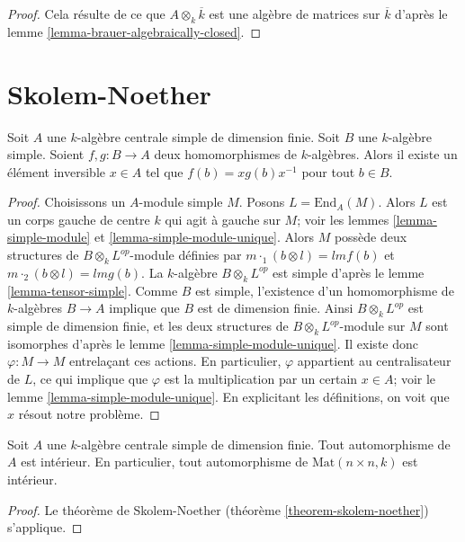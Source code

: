 \begin{proof}
Cela résulte de ce que $A \otimes_k \overline{k}$ est une algèbre de matrices
sur $\overline{k}$ d'après le
lemme \ref{lemma-brauer-algebraically-closed}.
\end{proof}
\section{Skolem-Noether}
\label{section-skolem-noether}



\begin{theorem}
\label{theorem-skolem-noether}
Soit $A$ une $k$-algèbre centrale simple de dimension finie. Soit $B$ une
$k$-algèbre simple. Soient $f, g : B \to A$ deux homomorphismes de $k$-algèbres.
Alors il existe un élément inversible $x \in A$ tel que
$f(b) = xg(b)x^{-1}$ pour tout $b \in B$.
\end{theorem}

\begin{proof}
Choisissons un $A$-module simple $M$. Posons $L = \text{End}_A(M)$.
Alors $L$ est un corps gauche de centre $k$ qui agit à gauche sur $M$; voir les
lemmes \ref{lemma-simple-module} et \ref{lemma-simple-module-unique}.
Alors $M$ possède deux structures de $B \otimes_k L^{op}$-module définies par
$m \cdot_1 (b \otimes l) = lmf(b)$ et $m \cdot_2 (b \otimes l) = lmg(b)$.
La $k$-algèbre $B \otimes_k L^{op}$ est simple d'après le
lemme \ref{lemma-tensor-simple}. Comme $B$ est simple, l'existence d'un
homomorphisme de $k$-algèbres $B \to A$ implique que $B$ est de dimension finie. Ainsi
$B \otimes_k L^{op}$ est simple de dimension finie, et les deux structures de
$B \otimes_k L^{op}$-module sur $M$
sont isomorphes d'après le lemme \ref{lemma-simple-module-unique}.
Il existe donc $\varphi : M \to M$ entrelaçant ces actions.
En particulier, $\varphi$ appartient au centralisateur de $L$, ce qui implique que
$\varphi$ est la multiplication par un certain $x \in A$; voir le
lemme \ref{lemma-simple-module-unique}. En explicitant les définitions, on voit
que $x$ résout notre problème.
\end{proof}

\begin{lemma}
\label{lemma-automorphism-inner}
Soit $A$ une $k$-algèbre centrale simple de dimension finie. Tout automorphisme de $A$ est
intérieur. En particulier, tout automorphisme de $\text{Mat}(n \times n, k)$
est intérieur.
\end{lemma}

\begin{proof}
Le théorème de Skolem-Noether (théorème \ref{theorem-skolem-noether})
s'applique.
\end{proof}



